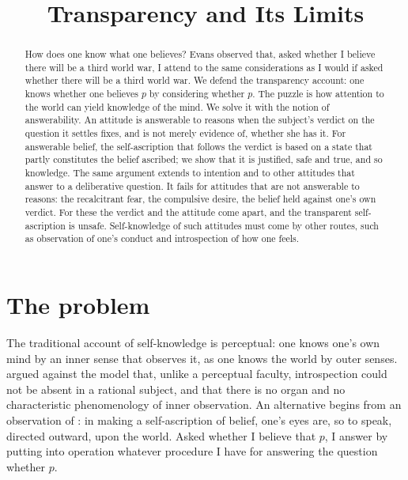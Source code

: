 \documentclass{situationist-preprint}
\title{Transparency and Its Limits}
\begin{document}
\maketitle

\begin{abstract}
How does one know what one believes? Evans observed that, asked whether I believe there will be a third world war, I attend to the same considerations as I would if asked whether there will be a third world war. We defend the transparency account: one knows whether one believes $p$ by considering whether $p$. The puzzle is how attention to the world can yield knowledge of the mind. We solve it with the notion of answerability. An attitude is answerable to reasons when the subject's verdict on the question it settles fixes, and is not merely evidence of, whether she has it. For answerable belief, the self-ascription that follows the verdict is based on a state that partly constitutes the belief ascribed; we show that it is justified, safe and true, and so knowledge. The same argument extends to intention and to other attitudes that answer to a deliberative question. It fails for attitudes that are not answerable to reasons: the recalcitrant fear, the compulsive desire, the belief held against one's own verdict. For these the verdict and the attitude come apart, and the transparent self-ascription is unsafe. Self-knowledge of such attitudes must come by other routes, such as observation of one's conduct and introspection of how one feels.
\end{abstract}

\section{The problem}

The traditional account of self-knowledge is perceptual: one knows one's own mind by an inner sense that observes it, as one knows the world by outer senses. \citet{Shoemaker1994} argued against the model that, unlike a perceptual faculty, introspection could not be absent in a rational subject, and that there is no organ and no characteristic phenomenology of inner observation. An alternative begins from an observation of \citet[225]{Evans1982}: in making a self-ascription of belief, one's eyes are, so to speak, directed outward, upon the world. Asked whether I believe that $p$, I answer by putting into operation whatever procedure I have for answering the question whether $p$.
\end{document}
